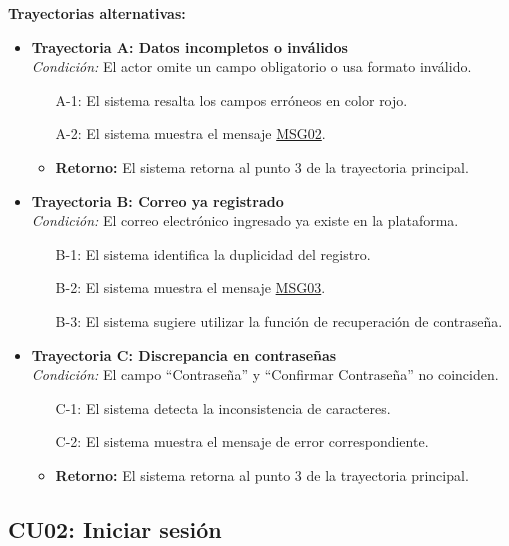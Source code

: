 \begin{appendices}
\textbf{Trayectorias alternativas:}
\begin{itemize}[leftmargin=*]
    \item \textbf{Trayectoria A: Datos incompletos o inválidos} \\
    \textit{Condición:} El actor omite un campo obligatorio o usa formato inválido.
    \begin{itemize}[nosep]
        \item[A-1:] El sistema resalta los campos erróneos en color rojo.
        \item[A-2:] El sistema muestra el mensaje \hyperlink{msg:MSG02}{MSG02}.
        \item \textbf{Retorno:} El sistema retorna al punto 3 de la trayectoria principal.
    \end{itemize}
    \item \textbf{Trayectoria B: Correo ya registrado} \\
    \textit{Condición:} El correo electrónico ingresado ya existe en la plataforma.
    \begin{itemize}[nosep]
        \item[B-1:] El sistema identifica la duplicidad del registro.
        \item[B-2:] El sistema muestra el mensaje \hyperlink{msg:MSG03}{MSG03}.
        \item[B-3:] El sistema sugiere utilizar la función de recuperación de contraseña.
    \end{itemize}
    \item \textbf{Trayectoria C: Discrepancia en contraseñas} \\
    \textit{Condición:} El campo ``Contraseña'' y ``Confirmar Contraseña'' no coinciden.
    \begin{itemize}[nosep]
        \item[C-1:] El sistema detecta la inconsistencia de caracteres.
        \item[C-2:] El sistema muestra el mensaje de error correspondiente.
        \item \textbf{Retorno:} El sistema retorna al punto 3 de la trayectoria principal.
    \end{itemize}
\end{itemize}

\newpage

\subsection{CU02: Iniciar sesión}


\end{appendices}
